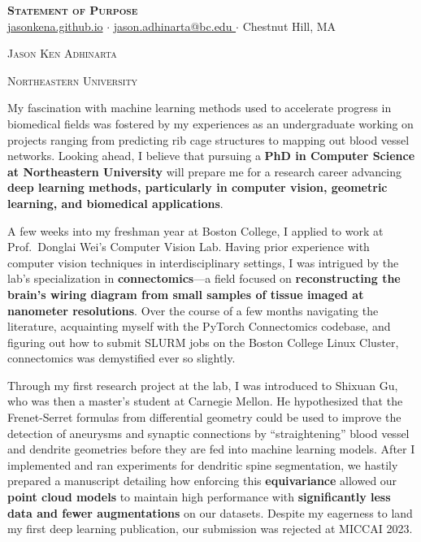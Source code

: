 \documentclass[letterpaper,11pt]{article}
\newcommand{\dualsectionold}[2]{%
  \noindent
    \parbox[b]{0.5\textwidth}{\raggedright\scshape\large #1}%
    \hfill
    \parbox[b]{0.5\textwidth}{\raggedleft\scshape\large #2}%
}
\newcommand{\dualsectionhline}{%
  \vspace{2pt}\color{black}\titlerule\vspace{-5pt}
}
\newcommand{\dualsection}[2]{%
  \dualsectionold{#1}{#2}%
  \vspace{-5pt}\dualsectionhline
}
\begin{document}
\justifying

\begin{center}
  \textbf{\Huge \scshape Statement of Purpose} \\ \vspace{3pt}
    \small
    \href{https://jasonkena.github.io}{jasonkena.github.io}
   \hspace{0.05cm}$\cdot$\hspace{0.05cm}
    \href{mailto:jason.adhinarta@bc.edu}{ jason.adhinarta@bc.edu }
   \hspace{0.05cm}$\cdot$\hspace{0.05cm}
    Chestnut Hill, MA
\end{center}


\dualsection{Jason Ken Adhinarta}{Northeastern University}
\vspace{2pt}\color{black}\titlerule%

My fascination with machine learning methods used to accelerate progress in biomedical fields was fostered by my experiences as an undergraduate working on projects ranging from predicting rib cage structures to mapping out blood vessel networks. Looking ahead, I believe that pursuing a \textbf{PhD in Computer Science at Northeastern University} will prepare me for a research career advancing \textbf{deep learning methods, particularly in computer vision, geometric learning, and biomedical applications}.

A few weeks into my freshman year at Boston College, I applied to work at Prof.\ Donglai Wei’s Computer Vision Lab. Having prior experience with computer vision techniques in interdisciplinary settings, I was intrigued by the lab’s specialization in \textbf{connectomics}---a field focused on \textbf{reconstructing the brain’s wiring diagram from small samples of tissue imaged at nanometer resolutions}. Over the course of a few months navigating the literature, acquainting myself with the PyTorch Connectomics codebase, and figuring out how to submit SLURM jobs on the Boston College Linux Cluster, connectomics was demystified ever so slightly.

Through my first research project at the lab, I was introduced to Shixuan Gu, who was then a master’s student at Carnegie Mellon. He hypothesized that the Frenet-Serret formulas from differential geometry could be used to improve the detection of aneurysms and synaptic connections by “straightening” blood vessel and dendrite geometries before they are fed into machine learning models. After I implemented and ran experiments for dendritic spine segmentation, we hastily prepared a manuscript detailing how enforcing this \textbf{equivariance} allowed our \textbf{point cloud models} to maintain high performance with \textbf{significantly less data and fewer augmentations} on our datasets. Despite my eagerness to land my first deep learning publication, our submission was rejected at MICCAI 2023.
\end{document}
